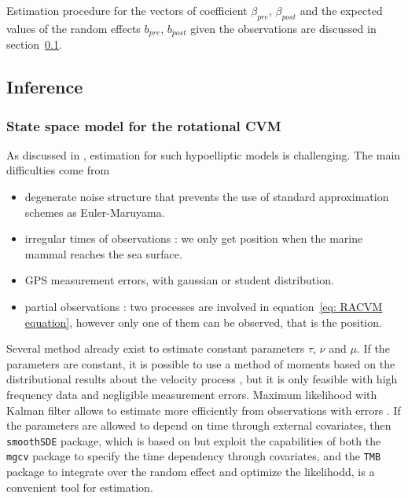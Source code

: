 \documentclass[11pt]{article}
\newcommand {\1}{\mathbb{1}}
\begin{document}
Estimation procedure for the vectors of coefficient $\beta_{pre}$, $\beta_{post}$ and the expected values of the random effects $b_{pre}$, $b_{post}$ given the observations are discussed in section~\ref{section: inference}.\\


\subsection{Inference}
\label{section: inference}

\subsubsection{State space model for the rotational CVM}

As discussed in \cite{ditlevsen_hypoelliptic_2019}, estimation for such hypoelliptic models is challenging. The main difficulties come from
\begin{itemize}
	\item degenerate noise structure that prevents the use of standard approximation schemes as Euler-Maruyama.
	 \item irregular times of observations : we only get position when the marine mammal reaches the sea surface.
	 \item GPS measurement errors, with gaussian or student distribution.
	 \item partial observations : two processes are involved in equation~\ref{eq: RACVM equation}, however only one of them can be observed, that is the position.
\end{itemize}


Several method already exist to estimate constant parameters $\tau$, $\nu$ and $\mu$.
If the parameters are constant, it is possible to use a method of moments based on the distributional results about the velocity process \cite{gurarie_correlated_2017}, but it is only feasible with high frequency data and negligible measurement errors. Maximum likelihood with Kalman filter allows to estimate more efficiently from observations with errors \cite{johnson_continuoustime_2008}.
If the parameters are allowed to depend on time through external covariates, then \texttt{smoothSDE} package, which is based on \cite{johnson_continuoustime_2008} but exploit the capabilities of both the \texttt{mgcv} package \cite{wood_generalized_2017} to specify the time dependency through covariates, and the \texttt{TMB} \cite{kristensen_tmb_2016} package to integrate over the random effect and optimize the likelihodd, is a convenient tool for estimation. 
\end{document}
